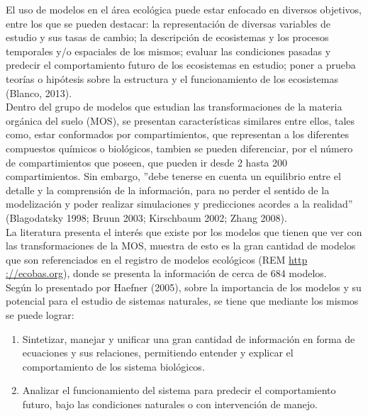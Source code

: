 El uso de modelos en el \'area ecol\'ogica puede estar enfocado en diversos objetivos, entre los que se pueden destacar: la representaci\'on de diversas variables de estudio y sus tasas de cambio; la descripci\'on de ecosistemas y los procesos temporales y/o espaciales de los mismos; evaluar las condiciones pasadas y predecir el comportamiento futuro de los ecosistemas en estudio; poner a prueba teor\'ias o hip\'otesis sobre la estructura y el funcionamiento de los ecosistemas (Blanco, 2013).\\

Dentro del grupo de modelos que estudian las transformaciones de la materia org\'anica del suelo (MOS), se  presentan caracter\'isticas similares entre ellos, tales como, estar conformados por compartimientos, que representan a los diferentes compuestos qu\'imicos o biol\'ogicos, tambien  se pueden diferenciar, por el n\'umero de compartimientos que poseen, que pueden ir desde 2 hasta 200 compartimientos. Sin embargo, ''debe tenerse en cuenta un equilibrio entre el detalle y la comprensi\'on de la informaci\'on, para no perder el sentido de la modelizaci\'on y poder realizar simulaciones y predicciones acordes a la realidad'' (Blagodatsky 1998; Bruun 2003; Kirschbaum 2002;  Zhang 2008).\\


La literatura presenta el inter\'es que existe por los modelos que tienen que ver con las transformaciones de la MOS, muestra de esto es la gran cantidad de modelos que son referenciados en el registro de modelos ecol\'ogicos (REM \url{http ://ecobas.org}), donde se presenta la informaci\'on de cerca de 684 modelos.\\

Seg\'un lo presentado por Haefner (2005), sobre la importancia de los modelos y su potencial para el estudio de sistemas naturales, se tiene que mediante los mismos se puede lograr:\\


\begin{enumerate}
  \item Sintetizar, manejar y unificar una gran cantidad de informaci\'on en forma de ecuaciones y sus relaciones, permitiendo entender y explicar el comportamiento de los sistema biol\'ogicos.
 \item Analizar el funcionamiento del sistema para predecir el comportamiento futuro, bajo las condiciones naturales o con intervenci\'on de manejo.
\end{enumerate}

